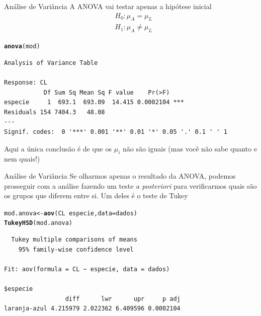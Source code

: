 \documentclass[10pt]{beamer}\usepackage[]{graphicx}\usepackage[]{color}
\makeatletter
\newcommand{\hlopt}[1]{\textcolor[rgb]{0,0,0}{#1}}%
\newcommand{\hlstd}[1]{\textcolor[rgb]{0.345,0.345,0.345}{#1}}%
\newcommand{\hlkwb}[1]{\textcolor[rgb]{0.69,0.353,0.396}{#1}}%
\newcommand{\hlkwc}[1]{\textcolor[rgb]{0.333,0.667,0.333}{#1}}%
\newcommand{\hlkwd}[1]{\textcolor[rgb]{0.737,0.353,0.396}{\textbf{#1}}}%
\newenvironment{kframe}{%
 \def\at@end@of@kframe{}%
 \ifinner\ifhmode%
  \def\at@end@of@kframe{\end{minipage}}%
  \begin{minipage}{\columnwidth}%
 \fi\fi%
 \def\FrameCommand##1{\hskip\@totalleftmargin \hskip-\fboxsep
 \colorbox{shadecolor}{##1}\hskip-\fboxsep
     \hskip-\linewidth \hskip-\@totalleftmargin \hskip\columnwidth}%
 \MakeFramed {\advance\hsize-\width
   \@totalleftmargin\z@ \linewidth\hsize
   \@setminipage}}%
 {\par\unskip\endMakeFramed%
 \at@end@of@kframe}
\newenvironment{knitrout}{}{} %
\theoremstyle{definition}
\makeatother
\begin{document}
\begin{frame}[fragile=singleslide]{Análise de Variância}
A ANOVA vai testar apenas a hipótese inicial
\begin{align*}
  &H_0: \mu_A = \mu_L \\
  &H_1: \mu_A \neq \mu_L
\end{align*}
\begin{knitrout}\small
{}\color{fgcolor}\begin{kframe}
\begin{alltt}
\hlkwd{anova}\hlstd{(mod)}
\end{alltt}
\begin{verbatim}
Analysis of Variance Table

Response: CL
           Df Sum Sq Mean Sq F value    Pr(>F)    
especie     1  693.1  693.09  14.415 0.0002104 ***
Residuals 154 7404.3   48.08                      
---
Signif. codes:  0 '***' 0.001 '**' 0.01 '*' 0.05 '.' 0.1 ' ' 1
\end{verbatim}
\end{kframe}
\end{knitrout}
Aqui a única conclusão é de que os $\mu_i$ não são iguais (mas você
não sabe quanto e nem quais!)
\end{frame}

\begin{frame}[fragile=singleslide]{Análise de Variância}
Se olharmos apenas o resultado da ANOVA, podemos prosseguir com a
análise fazendo um teste \textit{a posteriori} para verificarmos quais
são os grupos que diferem entre si. Um deles é o teste de Tukey
\begin{knitrout}\small
{}\color{fgcolor}\begin{kframe}
\begin{alltt}
\hlstd{mod.anova} \hlkwb{<-} \hlkwd{aov}\hlstd{(CL} \hlopt{~} \hlstd{especie,} \hlkwc{data} \hlstd{= dados)}
\hlkwd{TukeyHSD}\hlstd{(mod.anova)}
\end{alltt}
\begin{verbatim}
  Tukey multiple comparisons of means
    95% family-wise confidence level

Fit: aov(formula = CL ~ especie, data = dados)

$especie
                 diff      lwr      upr     p adj
laranja-azul 4.215979 2.022362 6.409596 0.0002104
\end{verbatim}
\end{kframe}
\end{knitrout}
\end{frame}
\end{document}
